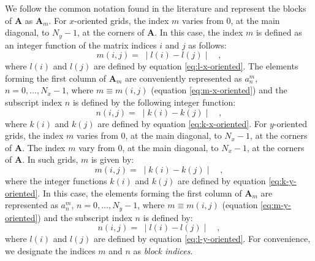 \documentclass[manuscript,revised]{geophysics}
\begin{document}
We follow the common notation found in the literature and represent the 
blocks of $\mathbf{A}$ as $\mathbf{A}_{m}$.
For $x$-oriented grids, the index $m$ varies from $0$, at the main diagonal,
to $N_{y} - 1$, at the corners of $\mathbf{A}$.
In this case, the index $m$ is defined as an integer function
of the matrix indices $i$ and $j$ as follows:
\begin{equation}
m(i, j) = \; \mid l(i) - l(j) \mid \quad ,
\label{eq:m-x-oriented}
\end{equation}
where $l(i)$ and $l(j)$ are defined by equation \ref{eq:l-x-oriented}.
The elements forming the first column of $\mathbf{A}_{m}$ are conveniently 
represented as $a^{m}_{n}$, $n = 0, \dots, N_{x} - 1$, where $m \equiv m(i, j)$ 
(equation \ref{eq:m-x-oriented}) and the subscript index $n$ is defined by the following
integer function:
\begin{equation}
n(i, j) = \; \mid k(i) - k(j) \mid \quad ,
\label{eq:n-x-oriented}
\end{equation}
where $k(i)$ and $k(j)$ are defined by equation \ref{eq:k-x-oriented}.
For $y$-oriented grids, the index $m$ varies from $0$, at the main diagonal,
to $N_{x} - 1$, at the corners of $\mathbf{A}$.
The index $m$ vary from $0$, at the main diagonal, to $N_{x} - 1$, at the 
corners of $\mathbf{A}$.
In such grids, $m$ is given by:
\begin{equation}
m(i, j) = \; \mid k(i) - k(j) \mid \quad ,
\label{eq:m-y-oriented}
\end{equation}
where the integer functions $k(i)$ and $k(j)$ are defined by equation \ref{eq:k-y-oriented}.
In this case, the elements forming the first column of $\mathbf{A}_{m}$ are 
represented as $a^{m}_{n}$, $n = 0, \dots, N_{y} - 1$, where $m \equiv m(i, j)$ 
(equation \ref{eq:m-y-oriented}) and the subscript index $n$ is defined by:
\begin{equation}
n(i, j) = \; \mid l(i) - l(j) \mid \quad ,
\label{eq:n-y-oriented}
\end{equation}
where $l(i)$ and $l(j)$ are defined by equation \ref{eq:l-y-oriented}.
For convenience, we designate the indices $m$ and $n$ as \textit{block indices}.
\end{document}
